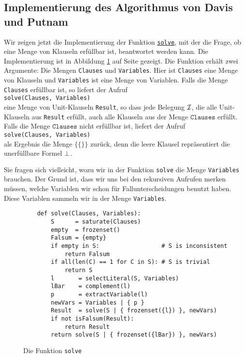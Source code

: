 \subsection{Implementierung des Algorithmus von Davis und Putnam}
Wir zeigen jetzt die Implementierung der Funktion 
\href{https://github.com/karlstroetmann/Logic/blob/master/SetlX/davis-putnam.stlx}{\texttt{solve}}, 
mit der die Frage, ob eine Menge von Klauseln erfüllbar ist, beantwortet werden kann. Die
Implementierung ist in Abbildung \ref{fig:solve} auf Seite \pageref{fig:solve}
gezeigt.  Die Funktion erhält zwei Argumente: Die Mengen \texttt{Clauses} und \texttt{Variables}.
Hier ist \texttt{Clauses} eine Menge von Klauseln und \texttt{Variables} ist eine Menge von
Variablen.  Falls die Menge \texttt{Clauses} erfüllbar ist, so liefert
der Aufruf 
\\[0.2cm]
\hspace*{1.3cm}
\texttt{solve(Clauses, Variables)} 
\\[0.2cm]
eine Menge von Unit-Klauseln \texttt{Result}, so
dass jede Belegung $\mathcal{I}$, die alle Unit-Klauseln aus \texttt{Result} erfüllt, auch alle Klauseln aus
der Menge  $\texttt{Clauses}$ erfüllt.  Falls die Menge $\texttt{Clauses}$ nicht erfüllbar ist, liefert der Aufruf
\\[0.2cm]
\hspace*{1.3cm}
\texttt{solve(Clauses, Variables)} 
\\[0.2cm]
als Ergebnis die Menge $\bigl\{ \{\} \bigr\}$ zurück, denn die leere Klausel repräsentiert die unerfüllbare Formel $\bot$.

Sie fragen sich vielleicht, wozu wir in der Funktion \texttt{solve} die Menge
\texttt{Variables} brauchen.  Der Grund ist, dass wir uns bei den rekursiven Aufrufen
merken müssen, welche Variablen wir schon für Fallunterscheidungen benutzt haben.  Diese Variablen sammeln wir in der
Menge \texttt{Variables}.


\begin{figure}[!ht]
  \centering
\begin{verbatim}
    def solve(Clauses, Variables):
        S      = saturate(Clauses)
        empty  = frozenset()
        Falsum = {empty}
        if empty in S:                  # S is inconsistent
            return Falsum           
        if all(len(C) == 1 for C in S): # S is trivial
            return S
        l       = selectLiteral(S, Variables)
        lBar    = complement(l)
        p       = extractVariable(l)
        newVars = Variables | { p }
        Result  = solve(S | { frozenset({l}) }, newVars)
        if not isFalsum(Result):
            return Result
        return solve(S | { frozenset({lBar}) }, newVars)
\end{verbatim}
\vspace*{-0.3cm}
  \caption{Die Funktion \texttt{solve}}
  \label{fig:solve}
\end{figure} 

